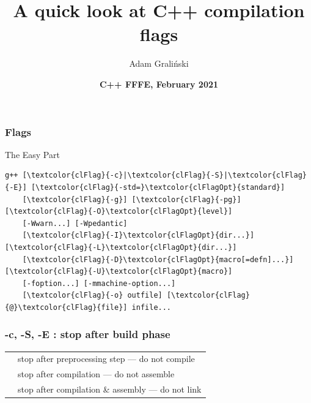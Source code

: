 \documentclass[aspectratio=169]{beamer}
\title[LTN02 :: CompilationFlags]{A quick look at C++ compilation flags}
\author{Adam Graliński}
\date[FFFE\_21]{\textbf{C++ {\color{red}F}{\color{blue}F}{\color{green}F}{\color{yellow}E}, February 2021}}
\begin{document}
{
\begin{frame}
\titlepage{}
\end{frame}
}

\begin{frame}[fragile]
\frametitle{Flags}
\centering
\begin{center}{\huge {\color{clGreen}The Easy Part}}\end{center}
\vspace{1ex}
\begin{BVerbatim}[commandchars=\\\{\}]
g++ [\textcolor{clFlag}{-c}|\textcolor{clFlag}{-S}|\textcolor{clFlag}{-E}] [\textcolor{clFlag}{-std=}\textcolor{clFlagOpt}{standard}]
    [\textcolor{clFlag}{-g}] [\textcolor{clFlag}{-pg}] [\textcolor{clFlag}{-O}\textcolor{clFlagOpt}{level}]
    [-Wwarn...] [-Wpedantic]
    [\textcolor{clFlag}{-I}\textcolor{clFlagOpt}{dir...}] [\textcolor{clFlag}{-L}\textcolor{clFlagOpt}{dir...}]
    [\textcolor{clFlag}{-D}\textcolor{clFlagOpt}{macro[=defn]...}] [\textcolor{clFlag}{-U}\textcolor{clFlagOpt}{macro}]
    [-foption...] [-mmachine-option...]
    [\textcolor{clFlag}{-o} outfile] [\textcolor{clFlag}{@}\textcolor{clFlag}{file}] infile...
\end{BVerbatim}
\end{frame}

\begin{frame}
\frametitle{-c, -S, -E : stop after build phase}
\begin{table}
\begin{tabular}{l l}
\toprule
\texttt{\color{clFlag}{-E}} & stop after preprocessing step --- do not compile \\ [3ex]
\texttt{\color{clFlag}{-S}} & stop after compilation --- do not assemble \\ [3ex]
\texttt{\color{clFlag}{-c}} & stop after compilation \& assembly --- do not link \\ [3ex]
\bottomrule
\end{tabular}
\end{table}
\end{frame}
\end{document}
